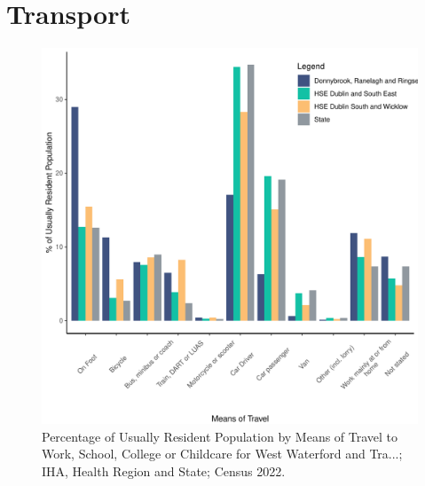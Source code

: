 \documentclass{article}
\begin{document}
\section{Transport}\label{sect:Trans}
\begin{figure}[H]
	\centering
	\includegraphics[width = 120mm]{../figures/TravelED.pdf}
	\caption{Percentage of Usually Resident Population by Means of Travel to Work, School, College or Childcare for West Waterford and Tra...; IHA, Health Region and State; Census 2022.}
	\label{fig:vbnv}
	\end{figure}
\end{document}
